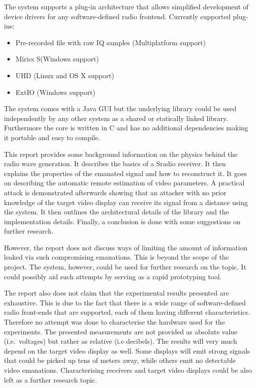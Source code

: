 \documentclass[a4paper,12pt,twoside,openright]{report}
\begin{document}
The system supports a plug-in architecture that allows simplified development of device drivers for any software-defined radio frontend. Currently supported plug-ins:

\begin{itemize}

  \item Pre-recorded file with raw IQ samples (Multiplatform support)
  \item Mirics S(Windows support)
  \item UHD (Linux and OS X support)
  \item ExtIO (Windows support)

\end{itemize}

The system comes with a Java GUI but the underlying library could be used independently by any other system as a shared or statically linked library. Furthermore the core is written in C and has no additional dependencies making it portable and easy to compile.

This report provides some background information on the physics behind the radio wave generation. It describes the basics of a Sradio receiver. It then explains the properties of the emanated signal and how to reconstruct it. It goes on describing the automatic remote estimation of video parameters. A practical attack is demonstrated afterwards showing that an attacker with no prior knowledge of the target video display can receive its signal from a distance using the system. It then outlines the architectural details of the library and the implementation details. Finally, a conclusion is done with some suggestions on further research.

However, the report does not discuss ways of limiting the amount of information leaked via such compromising emanations. This is beyond the scope of the project. The system, however, could be used for further research on the topic. It could possibly aid such attempts by serving as a rapid prototyping tool.

The report also does not claim that the experimental results presented are exhaustive. This is due to the fact that there is a wide range of software-defined radio front-ends that are supported, each of them having different characteristics. Therefore no attempt was done to characterise the hardware used for the experiments. The presented measurements are not provided as absolute value (i.e.\  voltages) but rather as relative (i.e decibels). The results will very much depend on the target video display as well. Some displays will emit strong signals that could be picked up tens of meters away, while others emit no detectable video emanations. Characterising receivers and target video displays could be also left as a further research topic.
\end{document}
